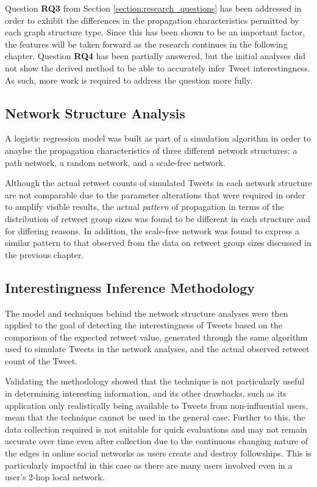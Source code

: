 Question \textbf{RQ3} from Section \ref{section:research_questions} has been addressed in order to exhibit the differences in the propagation characteristics permitted by each graph structure type. Since this has been shown to be an important factor, the features will be taken forward as the research continues in the following chapter. Question \textbf{RQ4} has been partially answered, but the initial analyses did not show the derived method to be able to accurately infer Tweet interestingness. As such, more work is required to address the question more fully.


\subsection{Network Structure Analysis}
A logistic regression model was built as part of a simulation algorithm in order to anaylse the propagation characteristics of three different network structures; a path network, a random network, and a scale-free network. 

Although the actual retweet counts of simulated Tweets in each network structure are not comparable due to the parameter alterations that were required in order to amplify visible results, the actual \textit{pattern} of propagation in terms of the distribution of retweet group sizes was found to be different in each structure and for differing reasons. In addition, the scale-free network was found to express a similar pattern to that observed from the data on retweet group sizes discussed in the previous chapter.


\subsection{Interestingness Inference Methodology}
The model and techniques behind the network structure analyses were then applied to the goal of detecting the interestingness of Tweets based on the comparison of the expected retweet value, generated through the same algorithm used to simulate Tweets in the network analyses, and the actual observed retweet count of the Tweet.

Validating the methodology showed that the technique is not particularly useful in determining interesting information, and its other drawbacks, such as its application only realistically being available to Tweets from non-influential users, mean that the technique cannot be used in the general case. Further to this, the data collection required is not suitable for quick evaluations and may not remain accurate over time even after collection due to the continuous changing nature of the edges in online social networks as users create and destroy followships. This is particularly impactful in this case as there are many users involved even in a user's 2-hop local network.

